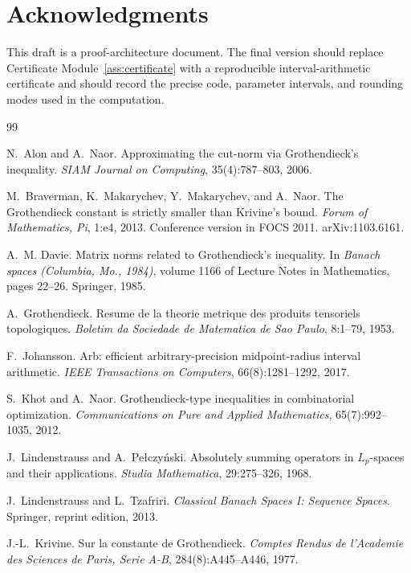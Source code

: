 \documentclass[11pt]{article}
\newcommand{\1}{\mathbf 1}
\theoremstyle{plain}
\theoremstyle{definition}
\theoremstyle{remark}
\begin{document}
\section*{Acknowledgments}
This draft is a proof-architecture document.  The final version should replace Certificate Module~\ref{ass:certificate} with a reproducible interval-arithmetic certificate and should record the precise code, parameter intervals, and rounding modes used in the computation.

\begin{thebibliography}{99}

N.~Alon and A.~Naor.
Approximating the cut-norm via Grothendieck's inequality.
\emph{SIAM Journal on Computing}, 35(4):787--803, 2006.

M.~Braverman, K.~Makarychev, Y.~Makarychev, and A.~Naor.
The Grothendieck constant is strictly smaller than Krivine's bound.
\emph{Forum of Mathematics, Pi}, 1:e4, 2013.
Conference version in FOCS 2011.  arXiv:1103.6161.


A.~M. Davie.
Matrix norms related to Grothendieck's inequality.
In \emph{Banach spaces (Columbia, Mo., 1984)}, volume 1166 of Lecture Notes in Mathematics, pages 22--26. Springer, 1985.

A.~Grothendieck.
Resume de la theorie metrique des produits tensoriels topologiques.
\emph{Boletim da Sociedade de Matematica de Sao Paulo}, 8:1--79, 1953.

F.~Johansson.
Arb: efficient arbitrary-precision midpoint-radius interval arithmetic.
\emph{IEEE Transactions on Computers}, 66(8):1281--1292, 2017.


S.~Khot and A.~Naor.
Grothendieck-type inequalities in combinatorial optimization.
\emph{Communications on Pure and Applied Mathematics}, 65(7):992--1035, 2012.

J.~Lindenstrauss and A.~Pe\l czy\'nski.
Absolutely summing operators in $L_p$-spaces and their applications.
\emph{Studia Mathematica}, 29:275--326, 1968.

J.~Lindenstrauss and L.~Tzafriri.
\emph{Classical Banach Spaces I: Sequence Spaces}.
Springer, reprint edition, 2013.

J.-L.~Krivine.
Sur la constante de Grothendieck.
\emph{Comptes Rendus de l'Academie des Sciences de Paris, Serie A-B}, 284(8):A445--A446, 1977.


\end{thebibliography}
\end{document}
